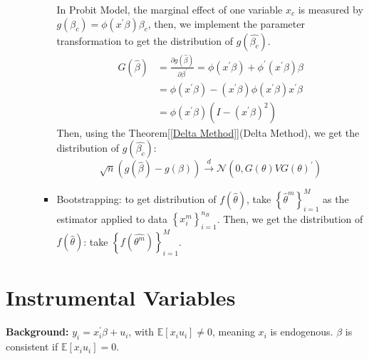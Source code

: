 \begin{enumerate}
\begin{itemize}
\begin{itemize}
\begin{eg}
                    In Probit Model, the marginal effect of one variable $x_c$ is measured by $g(\beta_c) = \phi(x^{\prime} \beta)\beta_c $,
                    then, we implement the parameter transformation to get the distribution of $g(\hat{\beta_c})$.
                    \begin{align*}
                        G(\hat{\beta}) &= \frac{\partial g(\hat{\beta})}{\partial \beta^{\prime}} = \phi(x^{\prime} \beta) + \phi^{\prime} (x^{\prime} \beta)\beta\\
                        &= \phi(x^{\prime} \beta) - (x^{\prime} \beta)\phi(x^{\prime} \beta)x^{\prime} \beta \\
                        &= \phi(x^{\prime} \beta)\left(I - (x^{\prime} \beta)^2 \right)
                    \end{align*}
                    Then, using the Theorem[\ref{Delta Method}](Delta Method), we get the distribution of $g(\hat{\beta_c})$:
                    \[ 
                    \sqrt{n}(g(\hat{\beta})- g(\beta)) \stackrel{d}{\rightarrow} \mathcal{N}\left(0, G(\theta) V G(\theta)^{\prime} \right) 
                    \]
                \end{eg}
            \item Bootstrapping: to get distribution of $f(\hat{\theta})$, take $\left\{ \hat{\theta}^m \right\}_{i=1}^{M}$ as the estimator applied to data $\left\{ x_i^{m} \right\}_{i=1}^{n_B}$.
                Then, we get the distribution of $f(\hat{\theta})$: take $\left\{ f(\hat{\theta^m}) \right\}_{i=1}^{M}$.
        \end{itemize}
    \end{itemize}
\end{enumerate}

\section{Instrumental Variables}

\textbf{Background:} $y_i = x_i^{\prime} \beta + u_i$, with $\mathbb{E}[x_i u_i] \neq 0$, meaning $x_i$ is endogenous.
$\beta$ is consistent if $\mathbb{E}[x_i u_i] = 0$.


